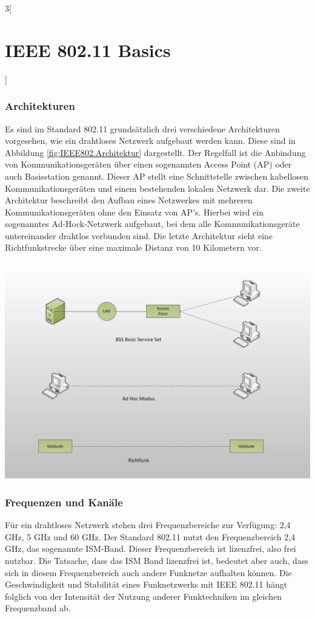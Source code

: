 \begin{multicols}{3}[\section{IEEE 802.11 Basics}]
\subsubsection*{Architekturen}  
Es sind im Standard 802.11 grundsätzlich drei verschiedene Architekturen vorgesehen, wie ein drahtloses Netzwerk aufgebaut werden kann. Diese sind in Abbildung  \ref{fig:IEEE802.Architektur} dargestellt. Der Regelfall ist die Anbindung von Kommunikationsgeräten über einen sogenannten Access Point (AP) oder auch Basisstation genannt. Dieser AP stellt eine Schnittstelle zwischen kabellosen Kommunikationsgeräten und einem bestehenden lokalen Netzwerk dar. Die zweite Architektur beschreibt den Aufbau eines Netzwerkes mit mehreren Kommunikationsgeräten ohne den Einsatz von AP’s. Hierbei wird ein sogenanntes Ad-Hock-Netzwerk aufgebaut, bei dem alle Kommunikationsgeräte untereinander drahtlos verbunden sind. Die letzte Architektur sieht eine Richtfunkstrecke über eine maximale Distanz von 10 Kilometern vor. ~\cite{basics.3}
\begin{Figure}
\includegraphics[width=\linewidth]{Kapitel/IEEE802.11/Grafiken/80211_Architektur.jpg}
\label{fig:IEEE802.Architektur}
\end{Figure}

\subsubsection*{Frequenzen und Kanäle}  
Für ein drahtloses Netzwerk stehen drei Frequenzbereiche zur Verfügung: 2,4 GHz, 5 GHz und 60 GHz. Der Standard 802.11 nutzt den Frequenzbereich 2,4 GHz, das sogenannte ISM-Band. Dieser Frequenzbereich ist lizenzfrei, also frei nutzbar. Die Tatsache, dass das ISM Band lizenzfrei ist, bedeutet aber auch, dass sich in diesem Frequenzbereich auch andere Funknetze aufhalten können. Die Geschwindigkeit und Stabilität eines Funknetzwerks mit IEEE 802.11 hängt folglich von der Intensität der Nutzung anderer Funktechniken im gleichen Frequenzband ab. 


\end{multicols}
